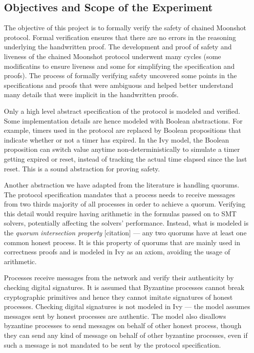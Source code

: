 \subsection{Objectives and Scope of the Experiment}
The objective of this project is to formally verify the safety of chained Moonshot protocol. Formal verification ensures that there are no errors in the reasoning underlying the handwritten proof. The development and proof of safety and liveness of the chained Moonshot protocol underwent many cycles (some modificatins to ensure liveness and some for simplifying the specification and proofs). The process of formally verifying safety uncovered some points in the specifications and proofs that were ambiguous and helped better understand many details that were implicit in the handwritten proofs.

Only a high level abstract specification of the protocol is modeled and verified. Some implementation details are hence modeled with Boolean abstractions. For example, timers used in the protocol are replaced by Boolean propositions that indicate whether or not a timer has expired. In the Ivy model, the Boolean proposition can switch value anytime non-deterministically to simulate a timer getting expired or reset, instead of tracking the actual time elapsed since the last reset. This is a sound abstraction for proving safety.

Another abstraction we have adapted from the literature is handling quorums. The protocol specification mandates that a process needs to receive messages from two thirds majority of all processes in order to achieve a quorum. Verifying this detail would require having arithmetic in the formulas passed on to SMT solvers, potentially affecting the solvers' performance. Instead, what is modeled is the \emph{quorum intersection property} [citation] --- any two quorums have at least one common honest process. It is this property of quorums that are mainly used in correctness proofs and is modeled in Ivy as an axiom, avoiding the usage of arithmetic.

Processes receive messages from the network and verify their authenticity by checking digital signatures. It is assumed that Byzantine processes cannot break cryptographic primitives and hence they cannot imitate signatures of honest processes. Checking digital signatures is not modeled in Ivy --- the model assumes messages sent by honest processes are authentic. The model also disallows byzantine processes to send messages on behalf of other honest process, though they can send any kind of message on behalf of other byzantine processes, even if such a message is not mandated to be sent by the protocol specification.